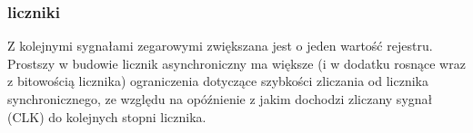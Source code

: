 \subsubsection{liczniki}
Z kolejnymi sygnałami zegarowymi zwiększana jest o jeden wartość rejestru. Prostszy w budowie licznik asynchroniczny ma większe (i w dodatku rosnące wraz z bitowością licznika) ograniczenia dotyczące szybkości zliczania od licznika synchronicznego, ze względu na opóźnienie z jakim dochodzi zliczany sygnał (CLK) do kolejnych stopni licznika.

\setcounter{subsection}{0}
